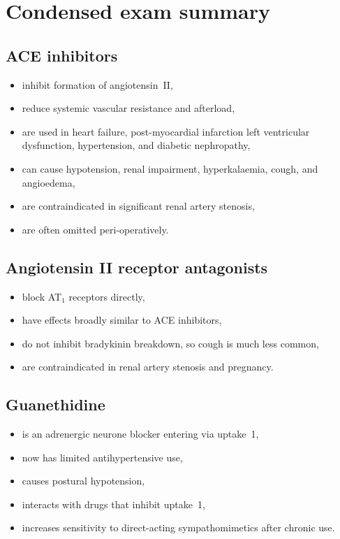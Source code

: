 \documentclass[11pt,a4paper]{article}
\begin{document}
\section{Condensed exam summary}

\subsection{ACE inhibitors}
\begin{itemize}
    \item inhibit formation of angiotensin~II,
    \item reduce systemic vascular resistance and afterload,
    \item are used in heart failure, post-myocardial infarction left ventricular dysfunction, hypertension, and diabetic nephropathy,
    \item can cause hypotension, renal impairment, hyperkalaemia, cough, and angioedema,
    \item are contraindicated in significant renal artery stenosis,
    \item are often omitted peri-operatively.
\end{itemize}

\subsection{Angiotensin II receptor antagonists}
\begin{itemize}
    \item block AT$_1$ receptors directly,
    \item have effects broadly similar to ACE inhibitors,
    \item do not inhibit bradykinin breakdown, so cough is much less common,
    \item are contraindicated in renal artery stenosis and pregnancy.
\end{itemize}

\subsection{Guanethidine}
\begin{itemize}
    \item is an adrenergic neurone blocker entering via uptake~1,
    \item now has limited antihypertensive use,
    \item causes postural hypotension,
    \item interacts with drugs that inhibit uptake~1,
    \item increases sensitivity to direct-acting sympathomimetics after chronic use.
\end{itemize}
\end{document}
